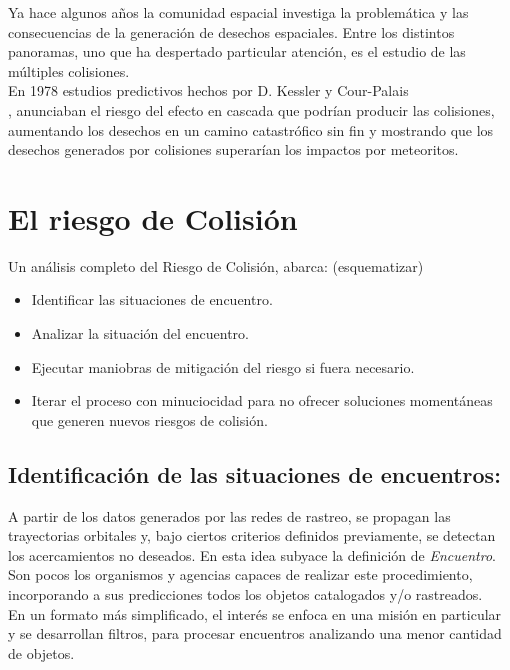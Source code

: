 Ya hace algunos a\~nos la comunidad espacial investiga la problem\'atica y las consecuencias de la generaci\'on de desechos espaciales. Entre los distintos panoramas, uno que ha despertado particular atenci\'on, es el estudio de las m\'ultiples colisiones.\\
En 1978  estudios predictivos hechos por D. Kessler y Cour-Palais\\
 \cite{kessler0}, anunciaban el riesgo del efecto en cascada que podr\'ian producir las colisiones, aumentando los desechos en un camino catastr\'ofico sin fin y mostrando que los desechos generados por colisiones superar\'ian los impactos por meteoritos.\\

\section{El riesgo de Colisi\'on}
Un an\'alisis completo del Riesgo de Colisi\'on, abarca: (esquematizar)

\begin{itemize}
\item Identificar las situaciones de encuentro.
\item Analizar la situaci\'on del encuentro.
\item Ejecutar maniobras de mitigaci\'on del riesgo si fuera necesario.
\item Iterar el proceso con minuciocidad para no ofrecer soluciones moment\'aneas que generen nuevos riesgos de colisi\'on.
\end{itemize}

\subsection*{Identificaci\'on de las situaciones de encuentros:}
A partir de los datos generados por las redes de rastreo, se propagan las trayectorias orbitales y, bajo ciertos criterios definidos previamente, se detectan los acercamientos no deseados. En esta idea subyace la definici\'on de {\it{Encuentro}}.\\
Son pocos los organismos y agencias capaces de realizar este procedimiento, incorporando a sus predicciones todos los objetos catalogados y/o rastreados.\\
En un formato m\'as simplificado, el inter\'es se enfoca en una misi\'on en particular y se desarrollan filtros, para procesar encuentros analizando una menor cantidad de objetos.\\


